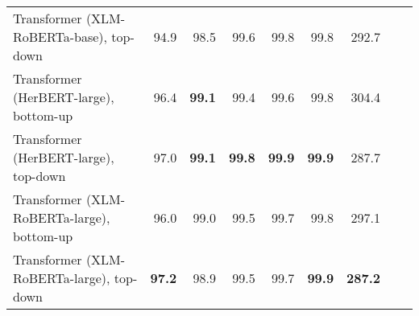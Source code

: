 \begin{table}[ht!]
{\begin{tabular}{lrrrrrrrr}
  Transformer (XLM-RoBERTa-base), top-down & 94.9 & 98.5 & 99.6 & 99.8 & 99.8 & 292.7 \\ 
  Transformer (HerBERT-large), bottom-up & 96.4 & \textbf{99.1} & 99.4 & 99.6 & 99.8 & 304.4 \\ 
  Transformer (HerBERT-large), top-down & 97.0 & \textbf{99.1} & \textbf{99.8} & \textbf{99.9} & \textbf{99.9} & 287.7 \\ 
  Transformer (XLM-RoBERTa-large), bottom-up & 96.0 & 99.0 & 99.5 & 99.7 & 99.8 & 297.1 \\ 
  Transformer (XLM-RoBERTa-large), top-down & \textbf{97.2} & 98.9 & 99.5 & 99.7 & \textbf{99.9} & \textbf{287.2} \\ 
   \hline
\end{tabular}
}
\end{table}




